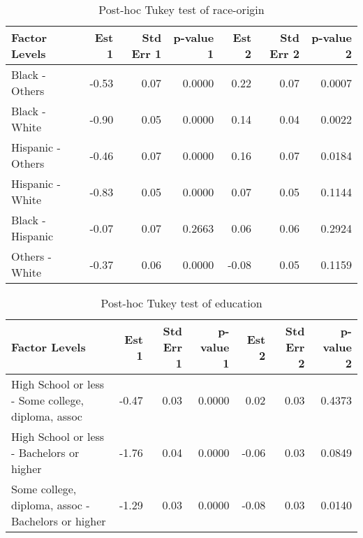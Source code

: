 \documentclass[11pt]{extarticle} %
\begin{document}
\begin{table}[H]
\footnotesize
\centering
\begin{tabular}{lrrrrrr}
  \hline
Factor Levels & Est 1 & Std Err 1 & p-value 1 & Est 2 & Std Err 2 & p-value 2 \\ 
  \hline
 Black - Others & -0.53 & 0.07 & 0.0000 & 0.22 & 0.07 & 0.0007 \\ 
   Black - White & -0.90 & 0.05 & 0.0000 & 0.14 & 0.04 & 0.0022 \\ 
   Hispanic - Others & -0.46 & 0.07 & 0.0000 & 0.16 & 0.07 & 0.0184 \\ 
   Hispanic - White & -0.83 & 0.05 & 0.0000 & 0.07 & 0.05 & 0.1144 \\ 
   Black - Hispanic & -0.07 & 0.07 & 0.2663 & 0.06 & 0.06 & 0.2924 \\ 
   Others - White & -0.37 & 0.06 & 0.0000 & -0.08 & 0.05 & 0.1159 \\ 
   \hline
\end{tabular}
\caption{Post-hoc Tukey test of race-origin} 
\label{tab:Table4RaceOrigin}
\end{table}

\begin{table}[H]
\footnotesize
\centering
\begin{tabular}{lrrrrrr}
  \hline
Factor Levels & Est 1 & Std Err 1 & p-value 1 & Est 2 & Std Err 2 & p-value 2 \\ 
  \hline
 High School or less - Some college, diploma, assoc & -0.47 & 0.03 & 0.0000 & 0.02 & 0.03 & 0.4373 \\ 
   High School or less - Bachelors or higher & -1.76 & 0.04 & 0.0000 & -0.06 & 0.03 & 0.0849 \\ 
   Some college, diploma, assoc - Bachelors or higher & -1.29 & 0.03 & 0.0000 & -0.08 & 0.03 & 0.0140 \\ 
   \hline
\end{tabular}
\caption{Post-hoc Tukey test of education} 
\label{tab:Table5Education}
\end{table}
\end{document}
